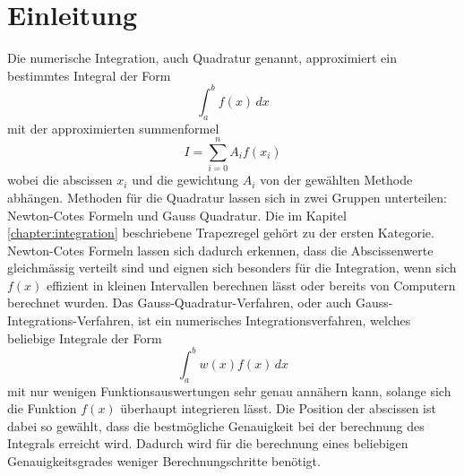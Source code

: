 %
%
%
\section{Einleitung\label{quadratur:section:einleitung}}

Die numerische Integration, auch Quadratur genannt, approximiert
 ein bestimmtes Integral der Form
\begin{equation}
    \int_{a}^{b} f(x) \,dx
\end{equation}
mit der approximierten summenformel 
\begin{equation}
    I = \sum_{i=0}^{n} A_i f(x_i)
\end{equation}
wobei die abscissen $x_i$ und die gewichtung $A_i$ von der gewählten 
Methode abhängen. 
Methoden für die Quadratur lassen sich in zwei Gruppen unterteilen: 
Newton-Cotes Formeln und Gauss Quadratur.
Die im Kapitel \ref{chapter:integration} beschriebene Trapezregel 
gehört zu der ersten Kategorie.
Newton-Cotes Formeln lassen sich dadurch erkennen, dass die Abscissenwerte 
gleichmässig verteilt sind und eignen sich besonders für die Integration, wenn sich $f(x)$ 
effizient in kleinen Intervallen berechnen lässt oder bereits von Computern berechnet wurden.
Das Gauss-Quadratur-Verfahren, oder auch Gauss-Integrations-Verfahren, 
ist ein numerisches Integrationsverfahren, welches beliebige Integrale der Form
\begin{equation}
\int_{a}^{b} w(x) f(x)\,dx
\end{equation}
mit nur wenigen Funktionsauswertungen sehr genau annähern kann, 
solange sich die Funktion $f(x)$ überhaupt integrieren lässt. 
Die Position der abscissen ist dabei so gewählt, 
dass die bestmögliche Genauigkeit bei der berechnung des Integrals erreicht wird.
Dadurch wird für die berechnung eines beliebigen Genauigkeitsgrades weniger Berechnungschritte benötigt.




